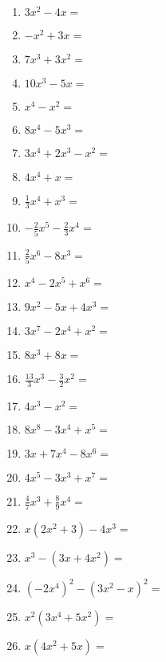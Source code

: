 \begin{Exercise}[title={Klammere so viele \(x\) wie möglich vor (ohne, dass \(x\) im Nenner eines Bruches benötigt wird)}, label=ausklammernA1]\\
	\begin{minipage}{\textwidth}
		\begin{minipage}{0.49\textwidth}
			\begin{enumerate}[label=\alph*)]
				\item \(3x^2-4x=\)
				\item \(-x^2+3x=\)
				\item \(7x^3+3x^2=\)
				\item \(10x^3-5x=\)
				\item \(x^4-x^2=\)
				\item \(8x^4-5x^3=\)
				\item \(3x^4+2x^3-x^2=\)
				\item \(4x^4+x=\)
				\item \(\frac{1}{3}x^4+x^3=\)
				\item \(-\frac{2}{5}x^5-\frac{2}{3}x^4=\)
				\item \(\frac{2}{5}x^6-8x^3=\)
				\item \(x^4-2x^5+x^6=\)
				\item \(9x^2-5x+4x^3=\)
			\end{enumerate}
		\end{minipage}
		\begin{minipage}{0.49\textwidth}
			\begin{enumerate}[label=\alph*)]
				\setcounter{enumi}{13}
				\item \(3x^7-2x^4+x^2=\)
				\item \(8x^3+8x=\)
				\item \(\frac{13}{3}x^3-\frac{3}{2}x^2=\)
				\item \(4x^3-x^2=\)
				\item \(8x^8-3x^4+x^5=\)
				\item \(3x+7x^4-8x^6=\)
				\item \(4x^5-3x^3+x^7=\)
				\item \(\frac{4}{7}x^3+\frac{8}{9}x^4=\)
				\item \(x\left( 2x^2+3\right) -4x^3=\)
				\item \(x^3-\left( 3x+4x^2\right)=\)
				\item \(\left(-2x^4\right)^2 -\left(3x^2-x\right)^2 =\)
				\item \(x^2\left(3x^4+5x^2\right) =\)
				\item \(x\left(4x^2+5x\right) =\)
			\end{enumerate}
		\end{minipage}
	\end{minipage}
\end{Exercise}
